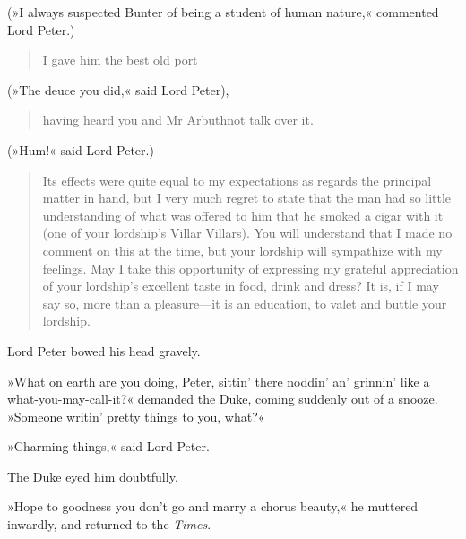 (»I always suspected Bunter of being a student of human nature,« commented Lord Peter.)

\begin{quotation}
I gave him the best old port 
\end{quotation}

(»The deuce you did,« said Lord Peter), 

\begin{quotation}
having heard you and Mr Arbuthnot talk over it.
\end{quotation}

 (»Hum!« said Lord Peter.)

\begin{quotation}
Its effects were quite equal to my expectations as regards the principal matter in hand, but I very much regret to state that the man had so little understanding of what was offered to him that he smoked a cigar with it (one of your lordship's Villar Villars). You will understand that I made no comment on this at the time, but your lordship will sympathize with my feelings. May I take this opportunity of expressing my grateful appreciation of your lordship's excellent taste in food, drink and dress? It is, if I may say so, more than a pleasure—it is an education, to valet and buttle your lordship.
\end{quotation}

Lord Peter bowed his head gravely.

»What on earth are you doing, Peter, sittin' there noddin' an' grinnin' like a what-you-may-call-it?« demanded the Duke, coming suddenly out of a snooze. »Someone writin' pretty things to you, what?«

»Charming things,« said Lord Peter.

The Duke eyed him doubtfully.

»Hope to goodness you don't go and marry a chorus beauty,« he muttered inwardly, and returned to the \textit{Times}.

